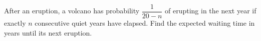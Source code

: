 After an eruption, a volcano has probability $\dfrac{1}{20-n}$ of erupting in the next year if exactly $n$ consecutive quiet years have elapsed. Find the expected waiting time in years until its next eruption.
